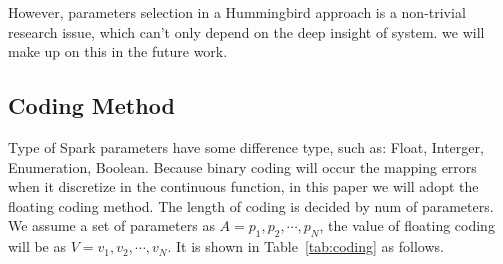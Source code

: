 \par However, parameters selection in a Hummingbird approach is a non-trivial research issue, which can’t only depend on the deep insight of system. we will make up on this in the future work.

\subsection{Coding Method}\label{subsec:coding}
\par Type of Spark parameters have some difference type, such as: Float, Interger, Enumeration, Boolean. Because binary coding will occur the mapping errors when it discretize in the continuous function, in this paper we will adopt the floating coding method. The length of coding is decided by num of parameters. We assume a set of parameters as  $A={p_1, p_2, \cdots,  p_N}$, the value of floating coding will be as $V={v_1, v_2, \cdots , v_N}$. It is shown in Table~\ref{tab:coding}  as follows.

